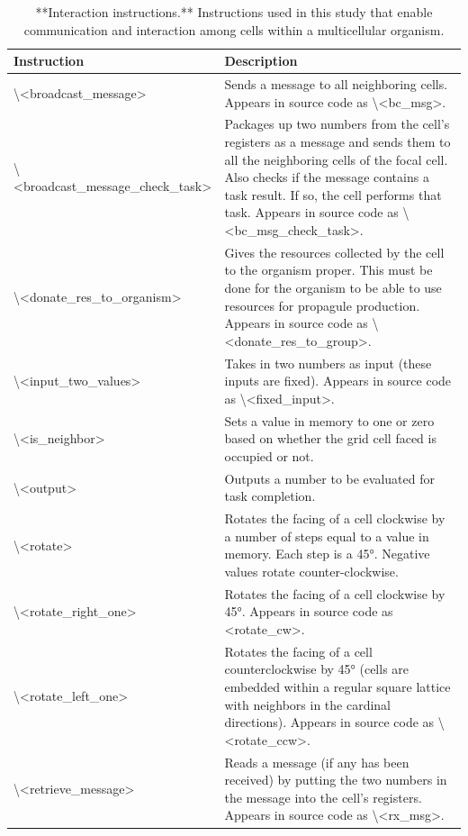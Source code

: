 \documentclass[
]{book}
\begin{document}
\begin{table}

\caption{\label{tab:Avida-instructions-Interaction-Table}**Interaction instructions.** Instructions used in this study that enable communication and interaction among cells within a multicellular organism.}
\centering
\begin{tabular}[t]{ll}
\toprule
Instruction & Description\\
\midrule
\textbackslash{}<broadcast\_message> & Sends a message to all neighboring cells. Appears in source code as \textbackslash{}<bc\_msg>.\\
\textbackslash{}<broadcast\_message\_check\_task> & Packages up two numbers from the cell's registers as a message and sends them to all the neighboring cells of the focal cell. Also checks if the message contains a task result. If so, the cell performs that task. Appears in source code as \textbackslash{}<bc\_msg\_check\_task>.\\
\textbackslash{}<donate\_res\_to\_organism> & Gives the resources collected by the cell to the organism proper. This must be done for the organism to be able to use resources for propagule production. Appears in source code as \textbackslash{}<donate\_res\_to\_group>.\\
\textbackslash{}<input\_two\_values> & Takes in two numbers as input (these inputs are fixed). Appears in source code as \textbackslash{}<fixed\_input>.\\
\textbackslash{}<is\_neighbor> & Sets a value in memory to one or zero based on whether the grid cell faced is occupied or not.\\
\addlinespace
\textbackslash{}<output> & Outputs a number to be evaluated for task completion.\\
\textbackslash{}<rotate> & Rotates the facing of a cell clockwise by a number of steps equal to a value in memory.  Each step is a 45°.  Negative values rotate counter-clockwise.\\
\textbackslash{}<rotate\_right\_one> & Rotates the facing of a cell clockwise by 45°. Appears in source code as <rotate\_cw>.\\
\textbackslash{}<rotate\_left\_one> & Rotates the facing of a cell counterclockwise by 45° (cells are embedded within a regular square lattice with neighbors in the cardinal directions). Appears in source code as \textbackslash{}<rotate\_ccw>.\\
\textbackslash{}<retrieve\_message> & Reads a message (if any has been received) by putting the two numbers in the message into the cell's registers. Appears in source code as \textbackslash{}<rx\_msg>.\\

\end{tabular}
\end{table}
\end{document}
